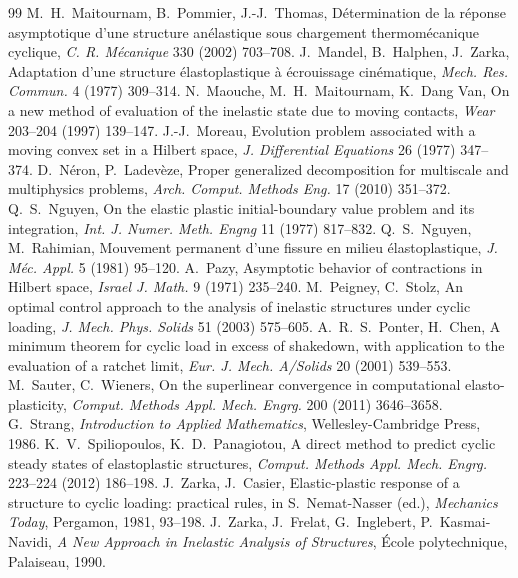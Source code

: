 \begin{chapterbib}{99}
 M.~H.~Maitournam, B.~Pommier, J.-J.~Thomas, D\'etermination de la r\'eponse asymptotique d'une structure an\'elastique sous chargement thermom\'ecanique cyclique, \emph{C. R. M\'ecanique} 330 (2002) 703--708.
 J.~Mandel, B.~Halphen, J.~Zarka, Adaptation d'une structure \'elastoplastique \`a \'ecrouissage cin\'ematique, \emph{Mech. Res. Commun.} 4 (1977) 309--314.
 N.~Maouche, M.~H.~Maitournam, K.~Dang Van, On a new method of evaluation of the inelastic state due to moving contacts, \emph{Wear} 203--204 (1997) 139--147.
 J.-J.~Moreau, Evolution problem associated with a moving convex set in a Hilbert space, \emph{J. Differential Equations} 26 (1977) 347--374.
 D.~N\'eron, P.~Ladev\`eze, Proper generalized decomposition for multiscale and multiphysics problems, \emph{Arch. Comput. Methods Eng.} 17 (2010) 351--372.
 Q.~S.~Nguyen, On the elastic plastic initial-boundary value problem and its integration, \emph{Int. J. Numer. Meth. Engng} 11 (1977) 817--832.
 Q.~S.~Nguyen, M.~Rahimian, Mouvement permanent d'une fissure en milieu \'elastoplastique, \emph{J. M\'ec. Appl.} 5 (1981) 95--120.
 A.~Pazy, Asymptotic behavior of contractions in Hilbert space, \emph{Israel J. Math.} 9 (1971) 235--240.
 M.~Peigney, C.~Stolz, An optimal control approach to the analysis of inelastic structures under cyclic loading, \emph{J. Mech. Phys. Solids} 51 (2003) 575--605.
 A.~R.~S.~Ponter, H.~Chen, A minimum theorem for cyclic load in excess of shakedown, with application to the evaluation of a ratchet limit, \emph{Eur. J. Mech. A/Solids} 20 (2001) 539--553.
 M.~Sauter, C.~Wieners, On the superlinear convergence in computational elasto-plasticity, \emph{Comput. Methods Appl. Mech. Engrg.} 200 (2011) 3646--3658.
 G.~Strang, \emph{Introduction to Applied Mathematics}, Wellesley-Cambridge Press, 1986.
 K.~V.~Spiliopoulos, K.~D.~Panagiotou, A direct method to predict cyclic steady states of elastoplastic structures, \emph{Comput. Methods Appl. Mech. Engrg.} 223--224 (2012) 186--198.
 J.~Zarka, J.~Casier, Elastic-plastic response of a structure to cyclic loading: practical rules, in S.~Nemat-Nasser (ed.), \emph{Mechanics Today}, Pergamon, 1981, 93--198.
 J.~Zarka, J.~Frelat, G.~Inglebert, P.~Kasmai-Navidi, \emph{A New Approach in Inelastic Analysis of Structures}, \'Ecole polytechnique, Palaiseau, 1990.
\end{chapterbib}
